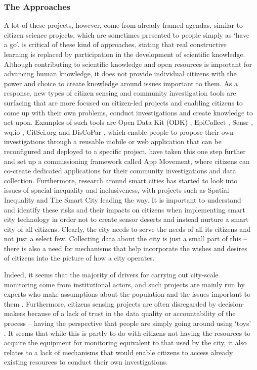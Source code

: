 \subsubsection{The Approaches}
A lot of these projects, however, come from already-framed agendas, similar to citizen science projects, which are sometimes presented to people simply as `have a go'. \citet[p. 384]{hakken_social_2003} is critical of these kind of approaches, stating that real constructive learning is replaced by participation in the development of scientific knowledge. Although contributing to scientific knowledge and open resources is important for advancing human knowledge, it does not provide individual citizens with the power and choice to create knowledge around issues important to them. As a response, new types of citizen sensing and community investigation tools are surfacing that are more focused on citizen-led projects and enabling citizens to come up with their own problems, conduct investigations and create knowledge to act upon. Examples of such tools are Open Data Kit (ODK) \citep{hartung_open_2010}, EpiCollect \citep{aanensen_epicollect:_2009}, Sensr \citep{kim_sensr:_2013}, wq.io \citep{sheppard_wq:_2012}, CitSci.org \citep{newman_art_2011} and DisCoPar \citep{zaman_discopar:_2015}, which enable people to propose their own investigations through a reusable mobile or web application that can be reconfigured and deployed to a specific project. \citet{garbett_app_2016} have taken this one step further and set up a commissioning framework called App Movement, where citizens can co-create dedicated applications for their community investigations and data collection. Furthermore, research around smart cities has started to look into issues of spacial inequality and inclusiveness, with projects such as Spatial Inequality and The Smart City \citep{franklin_spatial_2019} leading the way. It is important to understand and identify these risks and their impacts on citizens when implementing smart city technology in order not to create sensor deserts and instead nurture a smart city of all citizens. Clearly, the city needs to serve the needs of all its citizens and not just a select few. Collecting data about the city is just a small part of this -- there is also a need for mechanisms that help incorporate the wishes and desires of citizens into the picture of how a city operates.
\newline

\noindent
Indeed, it seems that the majority of drivers for carrying out city-scale monitoring come from institutional actors, and such projects are mainly run by experts who make assumptions about the population and the issues important to them \citep{townsend_smart_2013,tenney_data-driven_2016}. Furthermore, citizens sensing projects are often disregarded by decision-makers because of a lack of trust in the data quality or accountability of the process -- having the perspective that people are simply going around using `toys' \citep{gabrys_just_2018}. It seems that while this is partly to do with citizens not having the resources to acquire the equipment for monitoring equivalent to that used by the city, it also relates to a lack of mechanisms that would enable citizens to access already existing resources to conduct their own investigations.

